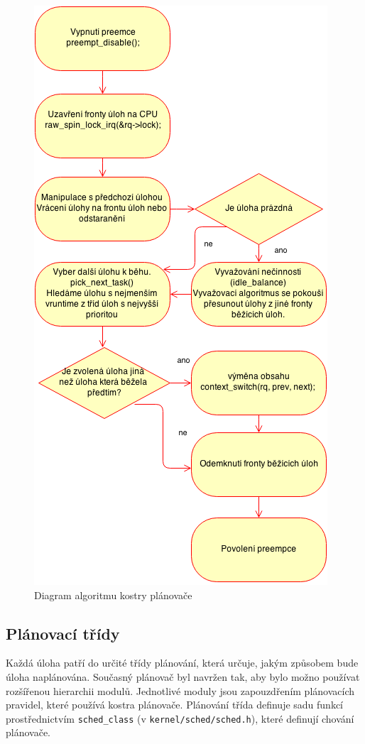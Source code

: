 \documentclass[a4paper,12pt]{article}
\begin{document}
\begin{figure}[p]
\center
\includegraphics[scale=0.7]{obrazky/kostraPlanovace.png}
\caption{Diagram algoritmu kostry plánovače}
\label{kostra planovace}
\end{figure}

\subsection{Plánovací třídy}
Každá úloha patří do určité třídy plánování, která určuje, jakým způsobem bude úloha naplánována. 
Současný plánovač byl navržen tak, aby bylo možno používat rozšířenou hierarchii modulů. Jednotlivé moduly jsou zapouzdřením plánovacích pravidel, které používá kostra plánovače. 
Plánování třída definuje sadu funkcí prostřednictvím \verb#sched_class# (v \verb#kernel/sched/sched.h#), které definují chování plánovače. 
\end{document}
